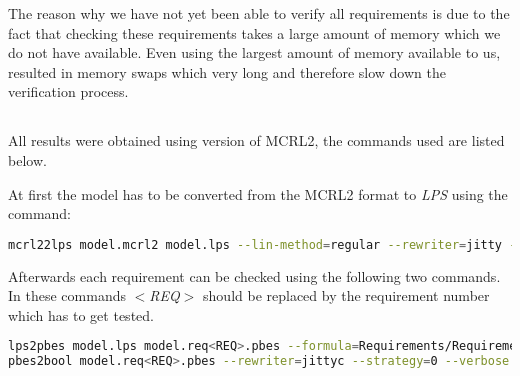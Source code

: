 The reason why we have not yet been able to verify all requirements is due to the fact that checking these requirements takes a large amount of memory which we do not have available. Even using the largest amount of memory available to us, resulted in memory swaps which very long and therefore slow down the verification process. 

\subsection{}
All results were obtained using version  of MCRL2, the commands used are listed below.

At first the model has to be converted from the MCRL2 format to \emph{LPS} using the command:
\begin{lstlisting}[language=bash]
mcrl22lps model.mcrl2 model.lps --lin-method=regular --rewriter=jitty --verbose
\end{lstlisting}

Afterwards each requirement can be checked using the following two commands. In these commands \emph{$<$REQ$>$} should be replaced by the requirement number which has to get tested.

\begin{lstlisting}[language=bash]
lps2pbes model.lps model.req<REQ>.pbes --formula=Requirements/Requirement<REQ>.mcf --verbose
pbes2bool model.req<REQ>.pbes --rewriter=jittyc --strategy=0 --verbose
\end{lstlisting}

